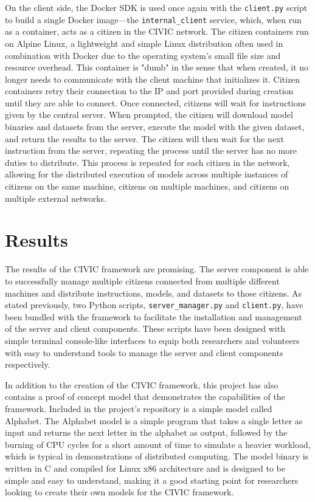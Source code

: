 \documentclass[11pt]{article}
\begin{document}
On the client side, the Docker SDK is used once again with the \verb|client.py| script to build a single Docker image---the \verb|internal_client| service, which, when run as a container, acts as a citizen in the CIVIC network. The citizen containers run on Alpine Linux, a lightweight and simple Linux distribution often used in combination with Docker due to the operating system's small file size and resource overhead. This container is "dumb" in the sense that when created, it no longer needs to communicate with the client machine that initializes it. Citizen containers retry their connection to the IP and port provided during creation until they are able to connect. Once connected, citizens will wait for instructions given by the central server. When prompted, the citizen will download model binaries and datasets from the server, execute the model with the given dataset, and return the results to the server. The citizen will then wait for the next instruction from the server, repeating the process until the server has no more duties to distribute. This process is repeated for each citizen in the network, allowing for the distributed execution of models across multiple instances of citizens on the same machine, citizens on multiple machines, and citizens on multiple external networks. 


\section{Results}

The results of the CIVIC framework are promising. The server component is able to successfully manage multiple citizens connected from multiple different machines and distribute instructions, models, and datasets to those citizens. As stated previously, two Python scripts, \verb|server_manager.py| and \verb|client.py|, have been bundled with the framework to facilitate the installation and management of the server and client components. These scripts have been designed with simple terminal console-like interfaces to equip both researchers and volunteers with easy to understand tools to manage the server and client components respectively. 

In addition to the creation of the CIVIC framework, this project has also contains a proof of concept model that demonstrates the capabilities of the framework. Included in the project's repository is a simple model called Alphabet. The Alphabet model is a simple program that takes a single letter as input and returns the next letter in the alphabet as output, followed by the burning of CPU cycles for a short amount of time to simulate a heavier workload, which is typical in demonstrations of distributed computing. The model binary is written in C and compiled for Linux x86 architecture and is designed to be simple and easy to understand, making it a good starting point for researchers looking to create their own models for the CIVIC framework.
\end{document}
